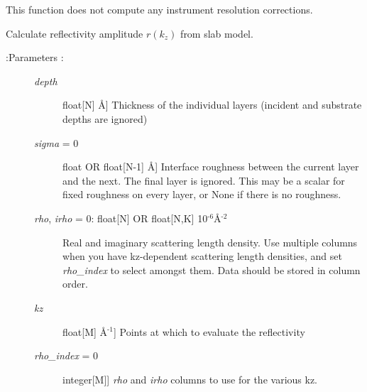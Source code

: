 \documentclass[letterpaper,10pt,english]{sphinxmanual}
\begin{document}
\begin{fulllineitems}
\begin{quote}
\begin{description}
\begin{description}
\end{description}

\end{description}\end{quote}

This function does not compute any instrument resolution corrections.

\end{fulllineitems}


\begin{fulllineitems}
\label{api/reflectivity:refl1d.reflectivity.reflectivity_amplitude}
Calculate reflectivity amplitude $r(k_z)$ from slab model.
\begin{description}
\item[{:Parameters :}] \leavevmode\begin{description}
\item[{\emph{depth}}] \leavevmode{[}float{[}N{]} \textbar{} Å{]}
Thickness of the individual layers (incident and substrate
depths are ignored)

\item[{\emph{sigma} = 0}] \leavevmode{[}float OR float{[}N-1{]} \textbar{} Å{]}
Interface roughness between the current layer and the next.
The final layer is ignored.  This may be a scalar for fixed
roughness on every layer, or None if there is no roughness.

\item[{\emph{rho}, \emph{irho} = 0: float{[}N{]} OR float{[}N,K{]} \textbar{} 10$^{\text{-6}}$Å$^{\text{-2}}$}] \leavevmode
Real and imaginary scattering length density.  Use multiple
columns when you have kz-dependent scattering length densities,
and set \emph{rho\_index} to select amongst them.  Data should be
stored in column order.

\item[{\emph{kz}}] \leavevmode{[}float{[}M{]} \textbar{} Å$^{\text{-1}}${]}
Points at which to evaluate the reflectivity

\item[{\emph{rho\_index} = 0}] \leavevmode{[}integer{[}M{]}{]}
\emph{rho} and \emph{irho} columns to use for the various kz.

\end{description}


\end{description}
\end{fulllineitems}
\end{document}
